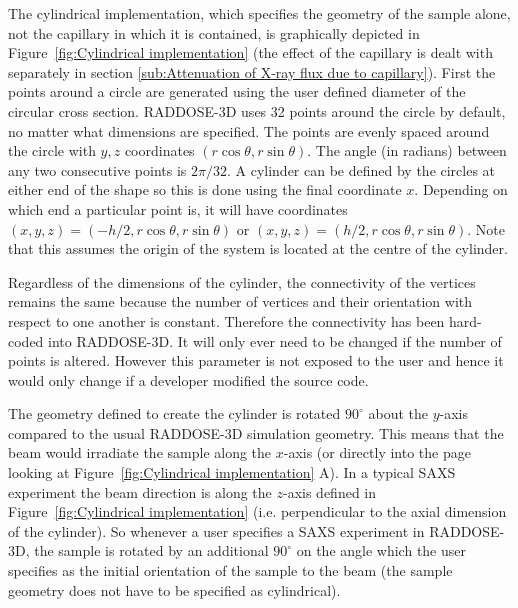 The cylindrical implementation, which specifies the geometry of the sample alone, not the capillary in which it is contained, is graphically depicted in Figure~\ref{fig:Cylindrical implementation} (the effect of the capillary is dealt with separately in section \ref{sub:Attenuation of X-ray flux due to capillary}).
First the points around a circle are generated using the user defined diameter of the circular cross section.
RADDOSE-3D uses 32 points around the circle by default, no matter what dimensions are specified.
The points are evenly spaced around the circle with $y, z$ coordinates $(r \cos \theta, r \sin \theta)$.
The angle (in radians) between any two consecutive points is $2 \pi / 32$.
A cylinder can be defined by the circles at either end of the shape so this is done using the final coordinate $x$.
Depending on which end a particular point is, it will have coordinates $(x, y, z) = (-h/2, r \cos \theta, r \sin \theta)$ or $(x, y, z) = (h/2, r \cos \theta, r \sin \theta)$.
Note that this assumes the origin of the system is located at the centre of the cylinder.

Regardless of the dimensions of the cylinder, the connectivity of the vertices remains the same because the number of vertices and their orientation with respect to one another is constant.
Therefore the connectivity has been hard-coded into RADDOSE-3D.
It will only ever need to be changed if the number of points is altered.
However this parameter is not exposed to the user and hence it would only change if a developer modified the source code.

The geometry defined to create the cylinder is rotated $90^{\circ}$ about the $y$-axis compared to the usual RADDOSE-3D simulation geometry.
This means that the beam would irradiate the sample along the $x$-axis (or directly into the page looking at Figure~\ref{fig:Cylindrical implementation} A).
In a typical SAXS experiment the beam direction is along the $z$-axis defined in Figure~\ref{fig:Cylindrical implementation}  (i.e. perpendicular to the axial dimension of the cylinder).
So whenever a user specifies a SAXS experiment in RADDOSE-3D, the sample is rotated by an additional $90^{\circ}$ on the angle which the user specifies as the initial orientation of the sample to the beam (the sample geometry does not have to be specified as cylindrical).

